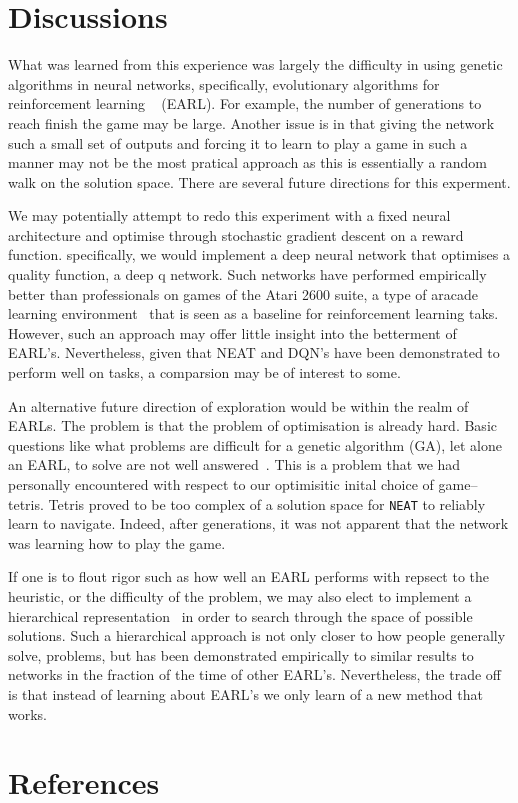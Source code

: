 \documentclass[letterpaper, twocolumn, conference]{article}
\begin{document}
\section{Discussions}
What was learned from this experience was largely the difficulty in using genetic algorithms in  neural networks, specifically, evolutionary algorithms for reinforcement learning ~\cite{Grefenstette99} (EARL). For example, the number of generations to reach finish the game may be large. Another issue is in that giving the network such a small set of outputs and forcing it to learn to play a game in such a manner may not be the most pratical approach as this is essentially a random walk on the solution space. There are several future directions for this experment.

We may potentially attempt to redo this experiment with a fixed neural architecture and optimise through stochastic gradient descent on a reward function. specifically, we would implement a deep neural network that optimises a quality function, a deep q network. Such networks have performed empirically better than professionals on games of the Atari 2600 suite, a type of aracade learning environment~\cite{Machado17} that is seen as a baseline for reinforcement learning taks. However, such an approach may offer little insight into the betterment of EARL's. Nevertheless, given that NEAT and DQN's have been demonstrated to perform well on tasks, a comparsion may be of interest to some.

An alternative future direction of exploration would be within the realm of EARLs. The problem is that the problem of optimisation is already hard. Basic questions like what problems are difficult for a genetic algorithm (GA), let alone an EARL, to solve are not well answered~\cite{stejpan09}. This is a problem that we had personally encountered with respect to our optimisitic inital choice of game-- tetris. Tetris proved to be too complex of a solution space for \texttt{NEAT} to reliably learn to navigate. Indeed, after generations, it was not apparent that the network was learning how to play the game.

If one is to flout rigor such as how well an EARL performs with repsect to the heuristic, or the difficulty of the problem, we may also elect to implement a hierarchical representation ~\cite{Liu17}in order to search through the space of possible solutions. Such a hierarchical approach is not only closer to how people generally solve, problems, but has been demonstrated empirically to similar results to networks in the fraction of the time of other EARL's. Nevertheless, the trade off is that instead of learning about EARL's we only learn of a new method that works.




\begingroup
    \section{References}
    \renewcommand{\section}[2]{}
    \nocite{*}
    
    
\endgroup
\end{document}
